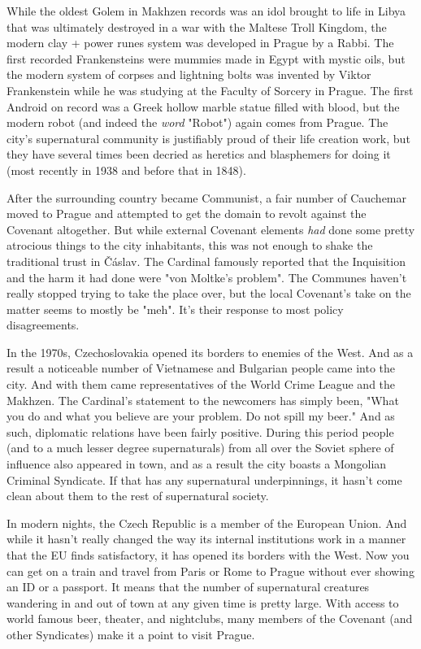 While the oldest Golem in Makhzen records was an idol brought to life in Libya that was ultimately destroyed in a war with the Maltese Troll Kingdom, the modern clay + power runes system was developed in Prague by a Rabbi. The first recorded Frankensteins were mummies made in Egypt with mystic oils, but the modern system of corpses and lightning bolts was invented by Viktor Frankenstein while he was studying at the Faculty of Sorcery in Prague. The first Android on record was a Greek hollow marble statue filled with blood, but the modern robot (and indeed the \textit{word} "Robot") again comes from Prague. The city's supernatural community is justifiably proud of their life creation work, but they have several times been decried as heretics and blasphemers for doing it (most recently in 1938 and before that in 1848).

After the surrounding country became Communist, a fair number of Cauchemar moved to Prague and attempted to get the domain to revolt against the Covenant altogether. But while external Covenant elements \textit{had} done some pretty atrocious things to the city inhabitants, this was not enough to shake the traditional trust in \v{C}\'{a}slav. The Cardinal famously reported that the Inquisition and the harm it had done were "von Moltke's problem". The Communes haven't really stopped trying to take the place over, but the local Covenant's take on the matter seems to mostly be "meh". It's their response to most policy disagreements.

In the 1970s, Czechoslovakia opened its borders to enemies of the West. And as a result a noticeable number of Vietnamese and Bulgarian people came into the city. And with them came representatives of the World Crime League and the Makhzen. The Cardinal's statement to the newcomers has simply been, "What you do and what you believe are your problem. Do not spill my beer." And as such, diplomatic relations have been fairly positive. During this period people (and to a much lesser degree supernaturals) from all over the Soviet sphere of influence also appeared in town, and as a result the city boasts a Mongolian Criminal Syndicate. If that has any supernatural underpinnings, it hasn't come clean about them to the rest of supernatural society.

In modern nights, the Czech Republic is a member of the European Union. And while it hasn't really changed the way its internal institutions work in a manner that the EU finds satisfactory, it has opened its borders with the West. Now you can get on a train and travel from Paris or Rome to Prague without ever showing an ID or a passport. It means that the number of supernatural creatures wandering in and out of town at any given time is pretty large. With access to world famous beer, theater, and nightclubs, many members of the Covenant (and other Syndicates) make it a point to visit Prague.

